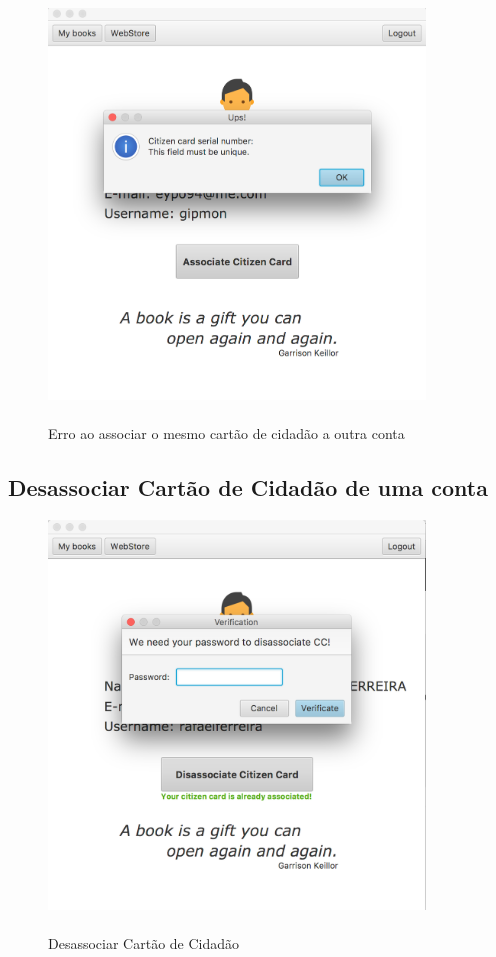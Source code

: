 \documentclass[pdftex,12pt,a4paper]{report}
\begin{document}
\begin{figure}[!htb]
\center
 \includegraphics[width=100mm,scale=1]{AssociateError.png}
 \caption{\\Erro ao associar o mesmo cartão de cidadão a outra conta}
 \label{fig:errorassociate}
\end{figure}

\newpage
\subsection{Desassociar Cartão de Cidadão de uma conta}

\begin{figure}[!htb]
\center
 \includegraphics[width=100mm,scale=1]{Disassociate.png}
 \caption{\\Desassociar Cartão de Cidadão}
 \label{fig:disassociate}
\end{figure}
\end{document}
